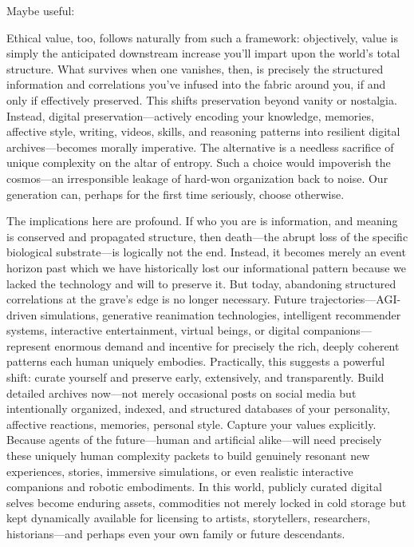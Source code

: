 \begin{itemize}
    Maybe useful:
    
    Ethical value, too, follows naturally from such a framework: objectively, value is simply the anticipated downstream increase you’ll impart upon the world’s total structure. What survives when one vanishes, then, is precisely the structured information and correlations you’ve infused into the fabric around you, if and only if effectively preserved. This shifts preservation beyond vanity or nostalgia. Instead, digital preservation---actively encoding your knowledge, memories, affective style, writing, videos, skills, and reasoning patterns into resilient digital archives---becomes morally imperative. The alternative is a needless sacrifice of unique complexity on the altar of entropy. Such a choice would impoverish the cosmos---an irresponsible leakage of hard-won organization back to noise. Our generation can, perhaps for the first time seriously, choose otherwise. 

    The implications here are profound. If who you are is information, and meaning is conserved and propagated structure, then death---the abrupt loss of the specific biological substrate---is logically not the end. Instead, it becomes merely an event horizon past which we have historically lost our informational pattern because we lacked the technology and will to preserve it. But today, abandoning structured correlations at the grave’s edge is no longer necessary. Future trajectories---AGI-driven simulations, generative reanimation technologies, intelligent recommender systems, interactive entertainment, virtual beings, or digital companions---represent enormous demand and incentive for precisely the rich, deeply coherent patterns each human uniquely embodies. Practically, this suggests a powerful shift: curate yourself and preserve early, extensively, and transparently. Build detailed archives now---not merely occasional posts on social media but intentionally organized, indexed, and structured databases of your personality, affective reactions, memories, personal style. Capture your values explicitly. Because agents of the future---human and artificial alike---will need precisely these uniquely human complexity packets to build genuinely resonant new experiences, stories, immersive simulations, or even realistic interactive companions and robotic embodiments. In this world, publicly curated digital selves become enduring assets, commodities not merely locked in cold storage but kept dynamically available for licensing to artists, storytellers, researchers, historians---and perhaps even your own family or future descendants.


\end{itemize}
